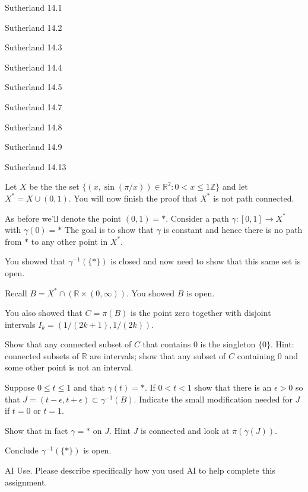 \documentclass[minion]{homework}
\newcommand{\Reals}{\ensuremath{\mathbb R}}%
\newcommand{\Ints}{\ensuremath{\mathbb Z}} %
\begin{document}
\begin{problems}

\problem Sutherland 14.1

\problem Sutherland 14.2

\problem Sutherland 14.3

\problem Sutherland 14.4

\problem Sutherland 14.5

\problem Sutherland 14.7 

\problem Sutherland 14.8

\problem Sutherland 14.9

\problem Sutherland 14.13

\problem Let $X$ be the the set $\{(x,\sin(\pi/x))\in \Reals^2: 0<x\le 1\Ints\}$
and let $X^*=X\cup (0,1)$.  You will now finish the proof
that $X^*$ is not path connected.

As before we'll denote the point
$(0,1)=*$.  Consider a path $\gamma:[0,1]\to X^*$ with $\gamma(0)=*$ 
The goal is to show that $\gamma$ is constant and hence there 
is no path from $*$ to any other point in $X^*$.

You showed that $\gamma^{-1}(\{*\})$ is closed and now need to show that 
this same set is open.

Recall $B= X^* \cap (\Reals\times (0,\infty))$. You showed $B$ is open.

You also showed that $C=\pi(B)$ is the point zero together with
disjoint intervals $I_k=(1/(2k+1),1/(2k))$.

\begin{subproblems}
\item Show that any connected subset of $C$ that contains $0$ is the singleton $\{0\}$.
Hint: connected subsets of $\Reals$ are intervals; show that any subset of $C$
containing $0$ and some other point is not an interval.
\item Suppose $0\le t\le 1$ and that $\gamma(t)=*$. If $0<t<1$ show 
that there is an $\epsilon>0$ so that $J=(t-\epsilon,t+\epsilon)\subset
\gamma^{-1}(B)$.  Indicate the small modification needed 
for $J$ if $t=0$ or $t=1$.
\item Show that in fact $\gamma=*$ on $J$.  Hint $J$ is connected and look at $\pi(\gamma(J))$.
\item Conclude $\gamma^{-1}(\{*\})$ is open.
\end{subproblems}

\problem AI Use. Please describe specifically how you used AI to help complete this assignment.

\end{problems}
\end{document}
